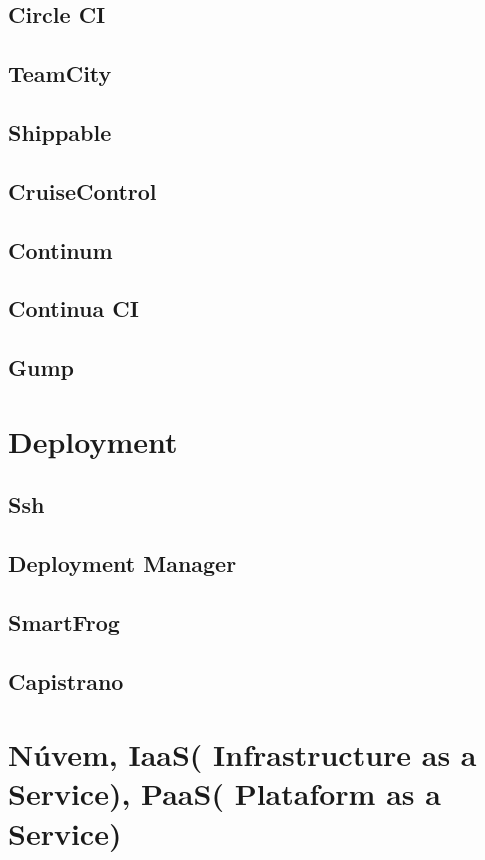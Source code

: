 	\subsection{Circle CI}
	\subsection{TeamCity}
	\subsection{Shippable}
	\subsection{CruiseControl}
	\subsection{Continum}
	\subsection{Continua CI}
	\subsection{Gump}

    \section{Deployment}

	\subsection{Ssh}
	\subsection{Deployment Manager}
	\subsection{SmartFrog}
	\subsection{Capistrano}

    \section{Núvem, IaaS( Infrastructure as a Service), PaaS( Plataform as a Service)}

